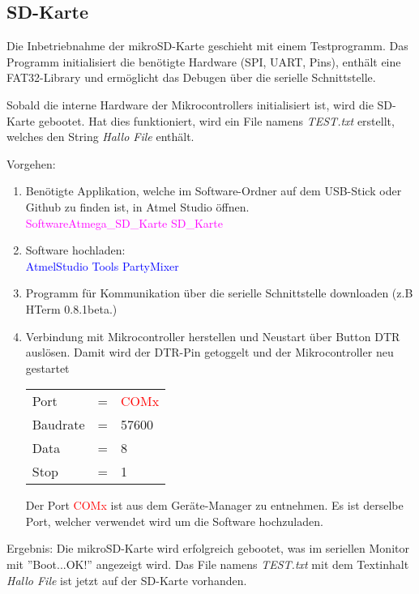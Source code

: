 \subsection{SD-Karte}
\label{subsubsec:Inbetriebnahme_mikroSD_Karte}

Die Inbetriebnahme der mikroSD-Karte geschieht mit einem Testprogramm. Das Programm initialisiert die benötigte Hardware (SPI, UART, Pins), enthält eine FAT32-Library und ermöglicht das Debugen über die serielle Schnittstelle.

Sobald die interne Hardware der Mikrocontrollers initialisiert ist, wird die SD-Karte gebootet. Hat dies funktioniert, wird ein File namens \textit{TEST.txt} erstellt, welches den String \textit{Hallo File} enthält.

Vorgehen:
\begin{enumerate}
\item Benötigte Applikation, welche im Software-Ordner auf dem USB-Stick oder Github \cite{aebi_projekt-6softwareatmega_2020} zu finden ist, in Atmel Studio öffnen.\\
\textcolor{magenta}{Software\textrightarrow Atmega\_SD\_Karte \textrightarrow SD\_Karte}\\

\item Software hochladen:\\
\textcolor{blue}{AtmelStudio \textrightarrow Tools \textrightarrow PartyMixer}\\

\item Programm für Kommunikation über die serielle Schnittstelle downloaden (z.B HTerm 0.8.1beta.)\cite{hammer_hterm_nodate}\\
\item Verbindung mit Mikrocontroller herstellen und Neustart über Button DTR auslösen. Damit wird der DTR-Pin getoggelt und der Mikrocontroller neu gestartet\\

\begin{table}[h!]
\center
\begin{tabular}{lcl}
Port & = & \textcolor{red}{COMx} \\
Baudrate & = & 57600 \\
Data & = & 8 \\
Stop & = & 1 \\
\end{tabular}
\end{table}

Der Port \textcolor{red}{COMx} ist aus dem Geräte-Manager zu entnehmen. Es ist derselbe Port, welcher verwendet wird um die Software hochzuladen.\\

\end{enumerate}

Ergebnis: Die mikroSD-Karte wird erfolgreich gebootet, was im seriellen Monitor mit ''Boot...OK!'' angezeigt wird. Das File namens \textit{TEST.txt} mit dem Textinhalt \textit{Hallo File} ist jetzt auf der SD-Karte vorhanden.